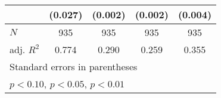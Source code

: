 {\begin{tabular}{l*{4}{c}}
            &     (0.027)         &     (0.002)         &     (0.002)         &     (0.004)         \\
\hline
\(N\)       &         935         &         935         &         935         &         935         \\
adj. \(R^{2}\)&       0.774         &       0.290         &       0.259         &       0.355         \\
\hline\hline
\multicolumn{5}{l}{\footnotesize Standard errors in parentheses}\\
\multicolumn{5}{l}{\footnotesize \sym{*} \(p<0.10\), \sym{**} \(p<0.05\), \sym{***} \(p<0.01\)}\\
\end{tabular}
}
